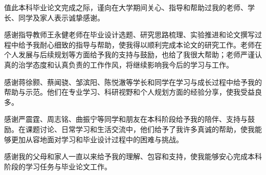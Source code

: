 \documentclass{seuthesis-2022}
\begin{document}
\begin{acknowledgement}
  值此本科毕业论文完成之际，谨向在大学期间关心、指导和帮助过我的老师、学长、同学及家人表示诚挚感谢。

  感谢指导教师王永健老师在毕业设计选题、研究思路梳理、实验推进和论文撰写过程中给予我耐心细致的指导与帮助，使我得以顺利完成本论文的研究工作。老师在个人发展与后续规划等方面给予我的支持与鼓励，也给了我很大帮助；老师严谨认真的治学态度和认真负责的工作作风，将继续影响我今后的学习与工作。

  感谢蒋徐颢、蔡闻骁、邹滨阳、陈悦澈等学长和同学在学习与成长过程中给予我的帮助与示范。他们在专业学习、科研视野和个人规划方面的经验分享，使我受益良多。

  感谢严震霆、周志铭、曲振宁等同学和朋友在本科阶段给予我的陪伴、支持与鼓励。在课题讨论、日常学习和生活交流中，他们给予了我许多真诚的帮助，使我能够更加从容地面对学习和毕业设计过程中的困难与挑战。

  感谢我的父母和家人一直以来给予我的理解、包容和支持，使我能够安心完成本科阶段的学习任务与毕业论文工作。
\end{acknowledgement}

\clearpage

\end{document}
